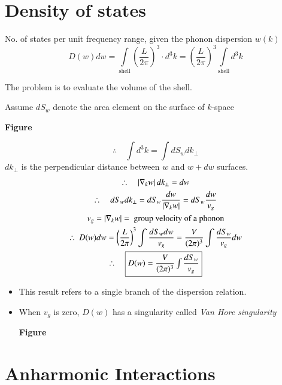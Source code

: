 \section*{Density of states}

No. of states per unit frequency range, given the phonon dispersion $w(k)$
$$
D(w)dw=\int\limits_{\text{shell}}\left(\dfrac{L}{2\pi}\right)^{3}\cdot d^{3}k=\left(\dfrac{L}{2\pi}\right)^{3}\int\limits_{\text{shell}}d^{3}k
$$

The problem is to evaluate the volume of the shell.

Assume $dS_{w}$ denote the area element on the surface of $k$-space
\begin{center}
{\bf Figure}
\end{center}
$$
\therefore\quad \int d^{3}k=\int dS_{w}dk_{\perp}
$$
$dk_{\perp}$ is the perpendicular distance between $w$ and $w+dw$ surfaces.
\begin{gather*}
\therefore\quad \left|\nabla_{k}w\right| dk_{\perp}=dw\\
\therefore\quad dS_{w}dk_{\perp}=dS_{w}\dfrac{dw}{|\nabla_{k}w|}=dS_{w}\dfrac{dw}{v_{g}}\\
v_{g}=|\nabla_{k}w|=\text{ group velocity of a phonon}\\
\therefore \ D(w)dw=\left(\dfrac{L}{2\pi}\right)^{3}\int \dfrac{dS_{w}dw}{v_{g}}=\dfrac{V}{(2\pi)^{3}}\int \dfrac{dS_{w}}{v_{g}}dw\\
\therefore \quad \fbox{$D(w)=\dfrac{V}{(2\pi)^{3}}\int \dfrac{dS_{w}}{v_{g}}$}
\end{gather*}
\begin{itemize}
\item This result refers to a single branch of the dispersion relation.

\item When $v_{g}$ is zero, $D(w)$ has a singularity called {\em Van Hore singularity}
\begin{center}
{\bf Figure}
\end{center}
\end{itemize}

\section*{Anharmonic Interactions}

